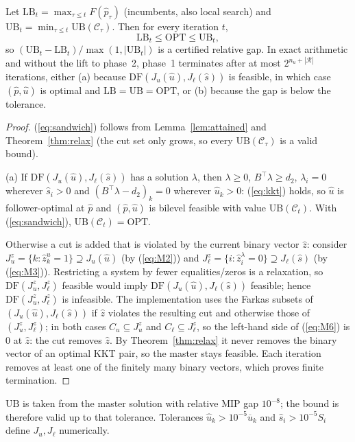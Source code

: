 \begin{theorem}\label{thm:benders}
Let $\mathrm{LB}_t=\max_{\tau\le t}F(\hat p_\tau)$ (incumbents, also local search) and
$\mathrm{UB}_t=\min_{\tau\le t}\mathrm{UB}(\mathcal C_\tau)$. Then for every iteration $t$,
\begin{equation}
\mathrm{LB}_t\le\mathrm{OPT}\le\mathrm{UB}_t,
\label{eq:sandwich}
\end{equation}
so $(\mathrm{UB}_t-\mathrm{LB}_t)/\max(1,|\mathrm{UB}_t|)$ is a certified relative gap.
In exact arithmetic and without the lift to phase~2, phase~1 terminates after at most
$2^{n_u+|\mathcal R|}$ iterations, either
(a) because $\mathrm{DF}(J_u(\hat u),J_\ell(\hat s))$ is feasible, in which case $(\hat p,\hat u)$ is
optimal and $\mathrm{LB}=\mathrm{UB}=\mathrm{OPT}$, or (b) because the gap is below the tolerance.
\end{theorem}
\begin{proof}
(\ref{eq:sandwich}) follows from Lemma~\ref{lem:attained} and Theorem~\ref{thm:relax}
(the cut set only grows, so every $\mathrm{UB}(\mathcal C_\tau)$ is a valid bound).

(a) If $\mathrm{DF}(J_u(\hat u),J_\ell(\hat s))$ has a solution $\lambda$, then $\lambda\ge0$,
$B^\top\lambda\ge d_2$, $\lambda_i=0$ wherever $\hat s_i>0$ and $(B^\top\lambda-d_2)_k=0$ wherever
$\hat u_k>0$: (\ref{eq:kkt}) holds, so $\hat u$ is follower-optimal at $\hat p$ and
$(\hat p,\hat u)$ is bilevel feasible with value $\mathrm{UB}(\mathcal C_t)$. With
(\ref{eq:sandwich}), $\mathrm{UB}(\mathcal C_t)=\mathrm{OPT}$.

Otherwise a cut is added that is violated by the current binary vector $\hat z$:
consider $J^z_u=\{k:\hat z^u_k=1\}\supseteq J_u(\hat u)$ (by (\ref{eq:M2})) and
$J^z_\ell=\{i:\hat z^\lambda_i=0\}\supseteq J_\ell(\hat s)$ (by (\ref{eq:M3})). Restricting a
system by fewer equalities/zeros is a relaxation, so $\mathrm{DF}(J^z_u,J^z_\ell)$ feasible
would imply $\mathrm{DF}(J_u(\hat u),J_\ell(\hat s))$ feasible; hence $\mathrm{DF}(J^z_u,J^z_\ell)$ is
infeasible. The implementation uses the Farkas subsets of $(J_u(\hat u),J_\ell(\hat s))$ if
$\hat z$ violates the resulting cut and otherwise those of $(J^z_u,J^z_\ell)$; in both cases
$C_u\subseteq J^z_u$ and $C_\ell\subseteq J^z_\ell$, so the left-hand side of (\ref{eq:M6}) is $0$
at $\hat z$: the cut removes $\hat z$. By Theorem~\ref{thm:relax} it never removes the binary
vector of an optimal KKT pair, so the master stays feasible. Each iteration removes at
least one of the finitely many binary vectors, which proves finite termination.
\end{proof}
\begin{remark}
$\mathrm{UB}$ is taken from the master solution with relative MIP gap $10^{-8}$; the bound is
therefore valid up to that tolerance. Tolerances $\hat u_k>10^{-5}\overline u_k$ and
$\hat s_i>10^{-5}S_i$ define $J_u,J_\ell$ numerically.
\end{remark}

